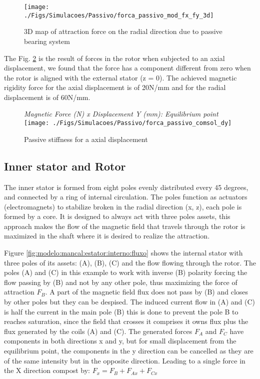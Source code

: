 \documentclass[10pt,fleqn,a4paper,twoside]{article}
\begin{document}
\begin{figure}[th]
\centering
\texttt{[image: ./Figs/Simulacoes/Passivo/forca\_passivo\_mod\_fx\_fy\_3d]}
\caption{3D map of attraction force on the radial direction due to passive bearing system}
\label{fig:forca:passivo:mod:fx:fy:3d}
\end{figure}

The Fig. \ref{fig:forca:passivo:comsol:dy} is the result of forces in the rotor when subjected to an axial displacement, we found that the force has a component different from zero when the rotor is aligned with the external stator (z = 0). The achieved magnetic rigidity force for the axial displacement is of 20N/mm and for the radial displacement is of 60N/mm. 

\begin{figure}[ht]
\centering
{\textit{Magnetic Force (N) x Displacement Y (mm): Equilibrium point}}\\
\texttt{[image: ./Figs/Simulacoes/Passivo/forca\_passivo\_comsol\_dy]}
\caption{Passive stiffness for a axial displacement }
\label{fig:forca:passivo:comsol:dy}
\end{figure}

\subsection{Inner stator and Rotor}

The inner stator is formed from eight poles evenly distributed every 45 degrees, and connected by a ring of internal circulation. The poles function as actuators (electromagnets) to stabilize broken in the radial direction (x, z), each pole is formed by a core.  It is designed to always act with three poles assets, this approach makes the flow of the magnetic field that travels through the rotor is maximized in the shaft where it is desired to realize the attraction.

Figure \ref{fig:modelo:mancal:estator:interno:fluxo} shows the internal stator with three poles of its assets: (A), (B), (C) and the flow flowing through the rotor. The poles (A) and (C) in this example to work with inverse (B) polarity forcing the flow passing by (B) and not by any other pole, thus maximizing the force of attraction $F_B$. A part of the magnetic field flux does not pass by (B) and closes by other poles but they can be despised. The induced current flow in (A) and (C) is half the current in the main pole (B) this is done to prevent the pole B to reaches saturation, since the field that crosses it comprises it owns flux plus the flux generated by the coils (A) and (C). The generated forces $F_A$ and $F_C$  have components in both directions x and y, but for small displacement from the equilibrium point, the components in the y direction can be cancelled as they are of the same intensity but in the opposite direction. Leading to a single force in the X direction compost by: $F_x = F_B + F_{Ax} + F_{Cx}$
\end{document}
